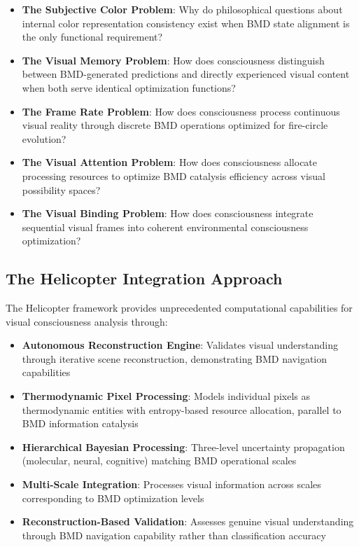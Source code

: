 \documentclass[12pt,a4paper]{article}
\begin{document}
\begin{itemize}
\item \textbf{The Subjective Color Problem}: Why do philosophical questions about internal color representation consistency exist when BMD state alignment is the only functional requirement?
\item \textbf{The Visual Memory Problem}: How does consciousness distinguish between BMD-generated predictions and directly experienced visual content when both serve identical optimization functions?
\item \textbf{The Frame Rate Problem}: How does consciousness process continuous visual reality through discrete BMD operations optimized for fire-circle evolution?
\item \textbf{The Visual Attention Problem}: How does consciousness allocate processing resources to optimize BMD catalysis efficiency across visual possibility spaces?
\item \textbf{The Visual Binding Problem}: How does consciousness integrate sequential visual frames into coherent environmental consciousness optimization?
\end{itemize}

\subsection{The Helicopter Integration Approach}

The Helicopter framework provides unprecedented computational capabilities for visual consciousness analysis through:

\begin{itemize}
\item \textbf{Autonomous Reconstruction Engine}: Validates visual understanding through iterative scene reconstruction, demonstrating BMD navigation capabilities
\item \textbf{Thermodynamic Pixel Processing}: Models individual pixels as thermodynamic entities with entropy-based resource allocation, parallel to BMD information catalysis
\item \textbf{Hierarchical Bayesian Processing}: Three-level uncertainty propagation (molecular, neural, cognitive) matching BMD operational scales
\item \textbf{Multi-Scale Integration}: Processes visual information across scales corresponding to BMD optimization levels
\item \textbf{Reconstruction-Based Validation}: Assesses genuine visual understanding through BMD navigation capability rather than classification accuracy
\end{itemize}
\end{document}
